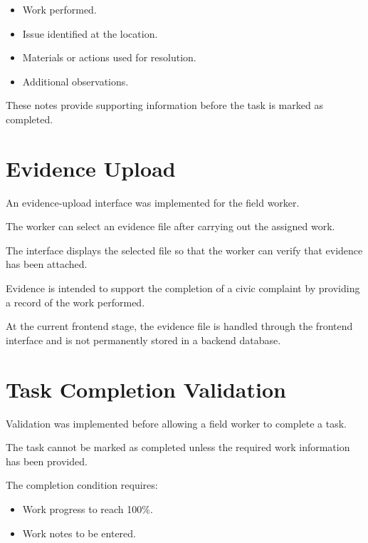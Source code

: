 \documentclass[12pt,a4paper]{article}
\begin{document}
\begin{itemize}
    \item Work performed.
    \item Issue identified at the location.
    \item Materials or actions used for resolution.
    \item Additional observations.
\end{itemize}

These notes provide supporting information before the task is marked as
completed.

\section{Evidence Upload}

An evidence-upload interface was implemented for the field worker.

The worker can select an evidence file after carrying out the assigned work.

The interface displays the selected file so that the worker can verify that
evidence has been attached.

Evidence is intended to support the completion of a civic complaint by
providing a record of the work performed.

At the current frontend stage, the evidence file is handled through the
frontend interface and is not permanently stored in a backend database.

\section{Task Completion Validation}

Validation was implemented before allowing a field worker to complete a
task.

The task cannot be marked as completed unless the required work information
has been provided.

The completion condition requires:

\begin{itemize}
    \item Work progress to reach 100\%.
    \item Work notes to be entered.
\end{itemize}
\end{document}
